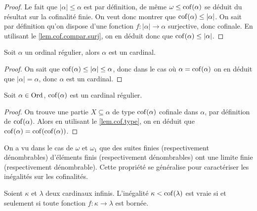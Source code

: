 \begin{proof}
  Le fait que $|\alpha|\leq \alpha$ est par définition, de même
  $\omega\leq\operatorname{cof}(\alpha)$ se déduit du résultat sur la cofinalité finie. On
  veut donc montrer que $\operatorname{cof}(\alpha) \leq|\alpha|$. On sait par définition
  qu'on dispose d'une fonction $f : |\alpha|\to \alpha$ surjective, donc
  cofinale. En utilisant le \cref{lem.cof.compar.surj}, on en déduit donc que
  $\operatorname{cof}(\alpha)\leq|\alpha|$.
\end{proof}

\begin{property}
  Soit $\alpha$ un ordinal régulier, alors $\alpha$ est un cardinal.
\end{property}

\begin{proof}
  On sait que $\operatorname{cof}(\alpha) \leq |\alpha| \leq \alpha$, donc dans le cas où
  $\alpha = \operatorname{cof}(\alpha)$ on en déduit que $|\alpha| = \alpha$, donc $\alpha$
  est un cardinal.
\end{proof}

\begin{property}
  Soit $\alpha\in\operatorname{Ord}$, $\operatorname{cof}(\alpha)$ est un cardinal régulier.
\end{property}

\begin{proof}
  On trouve une partie $X\subseteq\alpha$ de type $\operatorname{cof}(\alpha)$ cofinale dans
  $\alpha$, par définition de $\operatorname{cof}(\alpha)$. Alors en utilisant le
  \cref{lem.cof.type}, on en déduit que $\operatorname{cof}(\alpha) = \operatorname{cof}(\operatorname{cof}(\alpha))$.
\end{proof}

On a vu dans le cas de $\omega$ et $\omega_1$ que des suites finies
(respectivement dénombrables) d'éléments finis (respectivement dénombrables)
ont une limite finie (respectivement dénombrable). Cette propriété se généralise
pour caractériser les inégalités sur les cofinalités.

\begin{proposition}\label{prop.ineg.bounded}
  Soient $\kappa$ et $\lambda$ deux cardinaux infinis. L'inégalité
  $\kappa < \operatorname{cof}(\lambda)$ est vraie si et seulement si toute fonction
  $f : \kappa \to \lambda$ est bornée.
\end{proposition}

